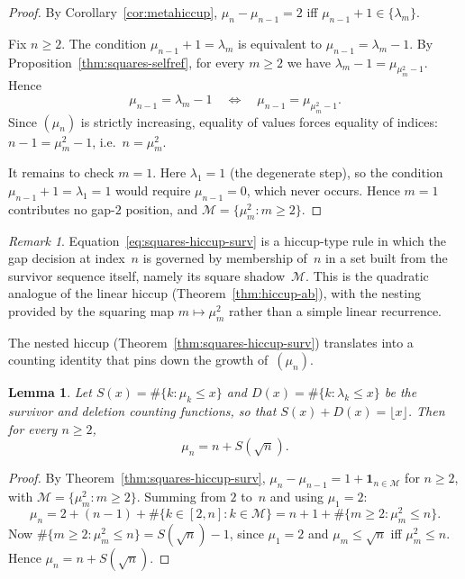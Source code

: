 \documentclass[11pt]{article}
\numberwithin{equation}{section}
\theoremstyle{plain}
\newtheorem{lemma}[theorem]{Lemma}
\theoremstyle{definition}
\theoremstyle{remark}
\newtheorem{remark}[theorem]{Remark}
\begin{document}
\begin{proof}
By Corollary~\ref{cor:metahiccup},
$\mu_n-\mu_{n-1}=2$ iff $\mu_{n-1}+1\in\{\lambda_m\}$.

Fix $n\ge2$.  The condition $\mu_{n-1}+1=\lambda_m$ is equivalent to
$\mu_{n-1}=\lambda_m-1$.  By Proposition~\ref{thm:squares-selfref}, for every
$m\ge2$ we have $\lambda_m-1=\mu_{\mu_m^2-1}$.  Hence
\[
  \mu_{n-1}=\lambda_m-1
  \quad\Longleftrightarrow\quad
  \mu_{n-1}=\mu_{\mu_m^2-1}.
\]
Since $(\mu_n)$ is strictly increasing, equality of values forces equality
of indices: $n-1=\mu_m^2-1$, i.e.\ $n=\mu_m^2$.

It remains to check $m=1$.  Here $\lambda_1=1$ (the degenerate step), so the
condition $\mu_{n-1}+1=\lambda_1=1$ would require $\mu_{n-1}=0$, which
never occurs.  Hence $m=1$ contributes no gap-$2$ position, and
$\mathcal{M}=\{\mu_m^2:m\ge2\}$.
\end{proof}

\begin{remark}
Equation~\eqref{eq:squares-hiccup-surv} is a hiccup-type rule in which the
gap decision at index~$n$ is governed by membership of~$n$ in a set built from
the survivor sequence itself, namely its square shadow~$\mathcal{M}$.  This is
the quadratic analogue of the linear hiccup (Theorem~\ref{thm:hiccup-ab}),
with the nesting provided by the squaring map $m\mapsto\mu_m^2$ rather than
a simple linear recurrence.
\end{remark}

The nested hiccup (Theorem~\ref{thm:squares-hiccup-surv}) translates
into a counting identity that pins down the growth of~$(\mu_n)$.

\begin{lemma}\label{lem:counting-squares}
Let $S(x)=\#\{k:\mu_k\le x\}$ and $D(x)=\#\{k:\lambda_k\le x\}$ be
the survivor and deletion counting functions, so that $S(x)+D(x)=\lfloor x\rfloor$.
Then for every $n\ge2$,
\begin{equation}\label{eq:mu-counting}
  \mu_n = n + S(\sqrt{n}).
\end{equation}
\end{lemma}

\begin{proof}
By Theorem~\ref{thm:squares-hiccup-surv},
$\mu_n-\mu_{n-1}=1+\mathbf{1}_{n\in\mathcal{M}}$ for $n\ge2$,
with $\mathcal{M}=\{\mu_m^2:m\ge2\}$.  Summing from $2$ to~$n$
and using $\mu_1=2$:
\[
  \mu_n = 2+(n-1)+\#\{k\in[2,n]:k\in\mathcal{M}\}
        = n+1+\#\{m\ge2:\mu_m^2\le n\}.
\]
Now $\#\{m\ge2:\mu_m^2\le n\}=S(\sqrt{n})-1$, since $\mu_1=2$
and $\mu_m\le\sqrt{n}$ iff $\mu_m^2\le n$.
Hence $\mu_n = n+S(\sqrt{n})$.
\end{proof}
\end{document}

